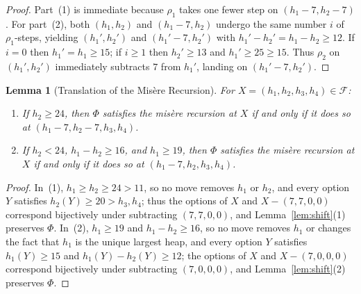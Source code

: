 \documentclass[11pt]{article}
\newtheorem{lemma}[theorem]{Lemma}
\begin{document}
\begin{proof}
Part~(1) is immediate because $\rho_1$ takes one fewer step on $(h_1 - 7, h_2 - 7)$. For part~(2), both $(h_1, h_2)$ and $(h_1 - 7, h_2)$ undergo the same number $i$ of $\rho_1$-steps, yielding $(h_1', h_2')$ and $(h_1' - 7, h_2')$ with $h_1' - h_2' = h_1 - h_2 \ge 12$. If $i = 0$ then $h_1' = h_1 \ge 15$; if $i \ge 1$ then $h_2' \ge 13$ and $h_1' \ge 25 \ge 15$. Thus $\rho_2$ on $(h_1', h_2')$ immediately subtracts $7$ from $h_1'$, landing on $(h_1' - 7, h_2')$.
\end{proof}

\begin{lemma}[Translation of the Mis\`{e}re Recursion]\label{lem:trans}
For $X = (h_1, h_2, h_3, h_4) \in \mathcal{F}$:
\begin{enumerate}
  \item If $h_2 \ge 24$, then $\Phi$ satisfies the mis\`{e}re recursion at $X$ if and only if it does so at $(h_1 - 7, h_2 - 7, h_3, h_4)$.
  \item If $h_2 < 24$, $h_1 - h_2 \ge 16$, and $h_1 \ge 19$, then $\Phi$ satisfies the mis\`{e}re recursion at $X$ if and only if it does so at $(h_1 - 7, h_2, h_3, h_4)$.
\end{enumerate}
\end{lemma}

\begin{proof}
In~(1), $h_1 \ge h_2 \ge 24 > 11$, so no move removes $h_1$ or $h_2$, and every option $Y$ satisfies $h_2(Y) \ge 20 > h_3, h_4$; thus the options of $X$ and $X - (7,7,0,0)$ correspond bijectively under subtracting $(7,7,0,0)$, and Lemma~\ref{lem:shift}(1) preserves $\Phi$. In~(2), $h_1 \ge 19$ and $h_1 - h_2 \ge 16$, so no move removes $h_1$ or changes the fact that $h_1$ is the unique largest heap, and every option $Y$ satisfies $h_1(Y) \ge 15$ and $h_1(Y) - h_2(Y) \ge 12$; the options of $X$ and $X - (7,0,0,0)$ correspond bijectively under subtracting $(7,0,0,0)$, and Lemma~\ref{lem:shift}(2) preserves $\Phi$.
\end{proof}
\end{document}
